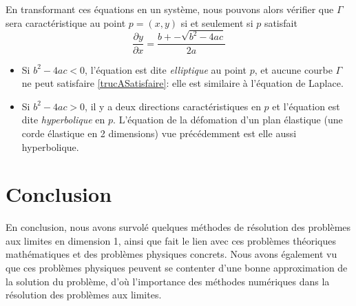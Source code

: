 \documentclass[12pt]{article}
\begin{document}
En transformant ces équations en un système, nous pouvons alors vérifier que $\Gamma$ sera caractéristique au point $p = (x,y)$ si et seulement si $p$ satisfait
\begin{equation}\label{trucASatisfaire}
\frac{\partial y}{\partial x} = \frac{b +- \sqrt{b^2 - 4ac}}{2a}
\end{equation}
\begin{itemize}
\item Si $b^2 - 4ac <0$,  l'équation est dite \emph{elliptique} au point $p$,  et aucune courbe $\Gamma$ ne peut satisfaire \eqref{trucASatisfaire}: elle est similaire à l'équation de Laplace.
\item Si $b^2 - 4ac >0$, il y a deux directions caractéristiques en $p$ et l'équation est dite \emph{hyperbolique} en $p$.  L'équation de la défomation d'un plan élastique (une corde élastique en 2 dimensions) vue précédemment est elle aussi hyperbolique.
\end{itemize}

\section{Conclusion}

\quad En conclusion, nous avons survolé quelques méthodes de résolution des problèmes aux limites en dimension 1, ainsi que fait le lien avec ces problèmes théoriques mathématiques et des problèmes physiques concrets. Nous avons également vu que ces problèmes physiques peuvent se contenter d'une bonne approximation de la solution du problème, d'où l'importance des méthodes numériques dans la résolution des problèmes aux limites.
\end{document}
